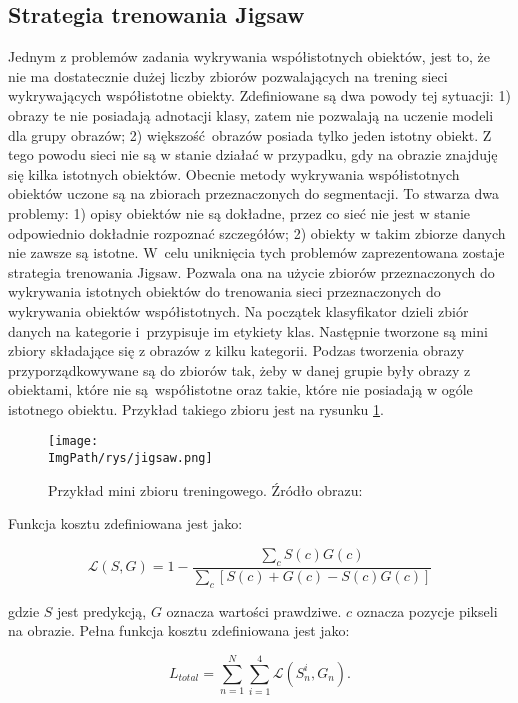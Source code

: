 \documentclass[a4paper,12pt,twoside,openany]{report}
\newcommand{\ImgPath}{.}
\begin{document}
\subsection{Strategia trenowania Jigsaw}
Jednym z problemów zadania wykrywania współistotnych obiektów, jest to, że nie ma dostatecznie dużej liczby zbiorów pozwalających na trening sieci wykrywających współistotne obiekty. Zdefiniowane są dwa powody tej sytuacji: 1) obrazy te nie posiadają adnotacji klasy, zatem nie pozwalają na uczenie modeli dla grupy obrazów; 2) większość obrazów posiada tylko jeden istotny obiekt. Z tego powodu sieci nie są w stanie działać w przypadku, gdy na obrazie znajduję się kilka istotnych obiektów. Obecnie metody wykrywania współistotnych obiektów uczone są na zbiorach przeznaczonych do segmentacji. To stwarza dwa problemy: 1) opisy obiektów nie są dokładne, przez co sieć nie jest w stanie odpowiednio dokładnie rozpoznać szczegółów; 2) obiekty w takim zbiorze danych nie zawsze są istotne. W~celu uniknięcia tych problemów zaprezentowana zostaje strategia trenowania Jigsaw. Pozwala ona na użycie zbiorów przeznaczonych do wykrywania istotnych obiektów do trenowania sieci przeznaczonych do wykrywania obiektów współistotnych. Na początek klasyfikator dzieli zbiór danych na kategorie i~przypisuje im etykiety klas. Następnie tworzone są mini zbiory składające się z obrazów z kilku kategorii. Podzas tworzenia obrazy przyporządkowywane są do zbiorów tak, żeby w danej grupie były obrazy z obiektami, które nie są współistotne oraz takie, które nie posiadają w ogóle istotnego obiektu. Przykład takiego zbioru jest na rysunku \ref{jigsaw}.

\begin{figure}[h]
	\centering
	\texttt{[image: \\ImgPath/rys/jigsaw.png]}
	\caption{Przykład mini zbioru treningowego. Źródło obrazu: \cite{zhang2020gradientinduced}}
	\label{jigsaw}
\end{figure}

Funkcja kosztu zdefiniowana jest jako:

\begin{equation}
	\mathcal{L}(S, G) = 1 - \frac{\sum_cS(c)G(c)}{\sum_c \left[S(c) + G(c) - S(c)G(c)\right]}
\end{equation}

gdzie $S$ jest predykcją, $G$ oznacza wartości prawdziwe. $c$ oznacza pozycje pikseli na obrazie. Pełna funkcja kosztu zdefiniowana jest jako:

\begin{equation}
	L_{total}=\sum^N_{n=1}\sum^4_{i=1}\mathcal{L}(S_n^i, G_n).
\end{equation}
\end{document}
